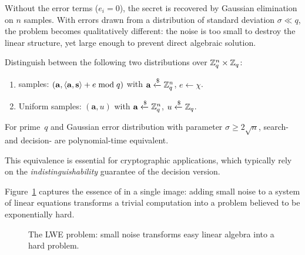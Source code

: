Without the error terms ($e_i = 0$), the secret is recovered by Gaussian elimination on $n$ samples.  With errors drawn from a distribution of standard deviation $\sigma \ll q$, the problem becomes qualitatively different: the noise is too small to destroy the linear structure, yet large enough to prevent direct algebraic solution.

\begin{definition}
\label{def:lwe-decision}
Distinguish between the following two distributions over $\mathbb{Z}_q^n \times \mathbb{Z}_q$:
\begin{enumerate}
\item \lwe{} samples: $(\mathbf{a}, \left\langle \mathbf{a}, \mathbf{s} \right\rangle + e \bmod q)$ with $\mathbf{a}\getsr\Zq^n$, $e\leftarrow\chi$.
\item Uniform samples: $(\mathbf{a}, u)$ with $\mathbf{a}\getsr\Zq^n$, $u\getsr\Zq$.
\end{enumerate}
\end{definition}

\begin{theorem}
\label{thm:search-decision}
For prime~$q$ and Gaussian error distribution with parameter $\sigma \geq 2\sqrt{n}$, search-\lwe{} and decision-\lwe{} are polynomial-time equivalent.
\end{theorem}

This equivalence is essential for cryptographic applications, which typically rely on the \emph{indistinguishability} guarantee of the decision version.

Figure~\ref{fig:ch07-lwe-picture} captures the essence of \lwe{} in a single image: adding small noise to a system of linear equations transforms a trivial computation into a problem believed to be exponentially hard.

\begin{figure}[t]
\centering
{}
\caption{The LWE problem: small noise transforms easy linear algebra into a hard problem.}
\label{fig:ch07-lwe-picture}
\end{figure}


